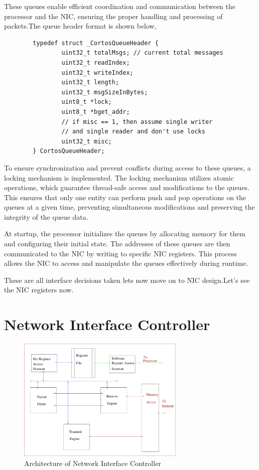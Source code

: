 \documentclass[12pt]{report}
\begin{document}
These queues enable efficient coordination and communication between the processor and the NIC, ensuring the proper handling and processing of packets.The queue header format is shown below,
		\begin{verbatim}
		typedef struct _CortosQueueHeader {
		        uint32_t totalMsgs; // current total messages
		        uint32_t readIndex;
		        uint32_t writeIndex;
		        uint32_t length;
		        uint32_t msgSizeInBytes;
		        uint8_t *lock;
		        uint8_t *bget_addr;
		        // if misc == 1, then assume single writer 
		        // and single reader and don't use locks
		        uint32_t misc;
		} CortosQueueHeader;
		\end{verbatim}
	

To ensure synchronization and prevent conflicts during access to these queues, a locking mechanism is implemented. The locking mechanism utilizes atomic operations, which guarantee thread-safe access and modifications to the queues. This ensures that only one entity can perform push and pop operations on the queues at a given time, preventing simultaneous modifications and preserving the integrity of the queue data.


At startup, the processor initializes the queues by allocating memory for them and configuring their initial state. The addresses of these queues are then communicated to the NIC by writing to specific NIC registers. This process allows the NIC to access and manipulate the queues effectively during runtime. 

		These are all interface decisions taken lets now move on to NIC design.Let's see the NIC registers now.

	\section{Network Interface Controller}
		

		\begin{figure}[h!]
			\centering
			\includegraphics[width=8cm]{./figures/NIC_Internal.pdf}
			\caption{Architecture of Network Interface Controller}
			\label{fig:NIC-Arch}
		\end{figure}
\end{document}
